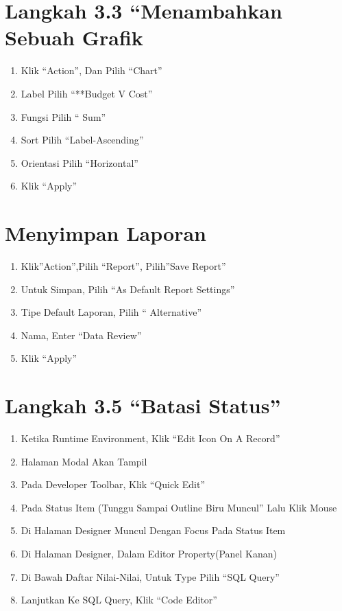 \documentclass{article}
\begin{document}
\section {Langkah 3.3 “Menambahkan Sebuah Grafik}
\begin{enumerate}
    \item Klik “Action”, Dan Pilih “Chart”
\item Label Pilih “**Budget V Cost”
\item Fungsi Pilih “ Sum”
\item Sort Pilih “Label-Ascending”
\item Orientasi Pilih “Horizontal”
\item Klik “Apply”
\end{enumerate}
\usepackage{*NB: Untuk Pengeditan Grafik Bias Dilakukan Dilaman App From Spreadsheet}
\section{Menyimpan Laporan}
\begin{enumerate}
    \item Klik”Action”,Pilih “Report”, Pilih”Save Report”
    \item Untuk Simpan, Pilih “As Default Report Settings”
    \item Tipe Default Laporan, Pilih “ Alternative”
    \item Nama, Enter “Data Review”
    \item Klik “Apply”

\end{enumerate}
\section{Langkah 3.5 “Batasi Status”}
    \begin{enumerate}
     \item Ketika Runtime Environment, Klik “Edit Icon On A Record”
    \item Halaman Modal Akan Tampil
    \item Pada Developer Toolbar, Klik “Quick Edit”
    \item Pada Status Item (Tunggu Sampai Outline Biru Muncul” Lalu Klik Mouse
    \item Di Halaman Designer Muncul Dengan Focus Pada Status Item
    \item Di Halaman Designer, Dalam Editor Property(Panel Kanan)
    \item Di Bawah Daftar Nilai-Nilai, Untuk Type Pilih “SQL Query”
    \item Lanjutkan Ke SQL Query, Klik “Code Editor”

    \end{enumerate}
\end{document}
